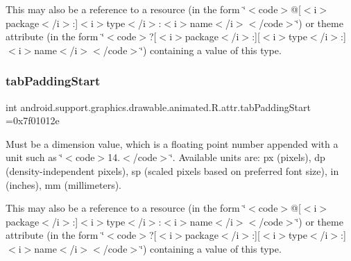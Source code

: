 This may also be a reference to a resource (in the form \char`\"{}$<$code$>$@\mbox{[}$<$i$>$package$<$/i$>$\+:\mbox{]}$<$i$>$type$<$/i$>$\+:$<$i$>$name$<$/i$>$$<$/code$>$\char`\"{}) or theme attribute (in the form \char`\"{}$<$code$>$?\mbox{[}$<$i$>$package$<$/i$>$\+:\mbox{]}\mbox{[}$<$i$>$type$<$/i$>$\+:\mbox{]}$<$i$>$name$<$/i$>$$<$/code$>$\char`\"{}) containing a value of this type. \mbox{\label{classandroid_1_1support_1_1graphics_1_1drawable_1_1animated_1_1R_1_1attr_a0e8b34ed15dfa4a0ae700e11062ee79b}} 
\subsubsection{\texorpdfstring{tab\+Padding\+Start}{tabPaddingStart}}
{\footnotesize\ttfamily int android.\+support.\+graphics.\+drawable.\+animated.\+R.\+attr.\+tab\+Padding\+Start =0x7f01012e\hspace{0.3cm}{\ttfamily [static]}}

Must be a dimension value, which is a floating point number appended with a unit such as \char`\"{}$<$code$>$14.\+5sp$<$/code$>$\char`\"{}. Available units are\+: px (pixels), dp (density-\/independent pixels), sp (scaled pixels based on preferred font size), in (inches), mm (millimeters). 

This may also be a reference to a resource (in the form \char`\"{}$<$code$>$@\mbox{[}$<$i$>$package$<$/i$>$\+:\mbox{]}$<$i$>$type$<$/i$>$\+:$<$i$>$name$<$/i$>$$<$/code$>$\char`\"{}) or theme attribute (in the form \char`\"{}$<$code$>$?\mbox{[}$<$i$>$package$<$/i$>$\+:\mbox{]}\mbox{[}$<$i$>$type$<$/i$>$\+:\mbox{]}$<$i$>$name$<$/i$>$$<$/code$>$\char`\"{}) containing a value of this type. \mbox{\label{classandroid_1_1support_1_1graphics_1_1drawable_1_1animated_1_1R_1_1attr_aa0e6ac3ce5a994e1557142a2f401651f}} 
